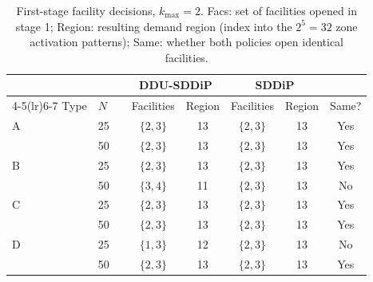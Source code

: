 \begin{table}[ht]
\centering
\caption{First-stage facility decisions, $k_{\max}=2$. Facs: set of facilities opened in stage 1; Region: resulting demand region (index into the $2^5=32$ zone activation patterns); Same: whether both policies open identical facilities.}
\label{tab:policy_k2}
\small
\begin{tabular}{llr cc cc c}
\toprule
 & & & \multicolumn{2}{c}{DDU-SDDiP} & \multicolumn{2}{c}{SDDiP} & \\
\cmidrule(lr){4-5}\cmidrule(lr){6-7}
Type & $N$ & & Facilities & Region & Facilities & Region & Same? \\
\midrule
A & 25 & & $\{2,3\}$ & 13 & $\{2,3\}$ & 13 & Yes \\
 & 50 & & $\{2,3\}$ & 13 & $\{2,3\}$ & 13 & Yes \\
\midrule
B & 25 & & $\{2,3\}$ & 13 & $\{2,3\}$ & 13 & Yes \\
 & 50 & & $\{3,4\}$ & 11 & $\{2,3\}$ & 13 & No \\
\midrule
C & 25 & & $\{2,3\}$ & 13 & $\{2,3\}$ & 13 & Yes \\
 & 50 & & $\{2,3\}$ & 13 & $\{2,3\}$ & 13 & Yes \\
\midrule
D & 25 & & $\{1,3\}$ & 12 & $\{2,3\}$ & 13 & No \\
 & 50 & & $\{2,3\}$ & 13 & $\{2,3\}$ & 13 & Yes \\
\bottomrule
\end{tabular}
\end{table}